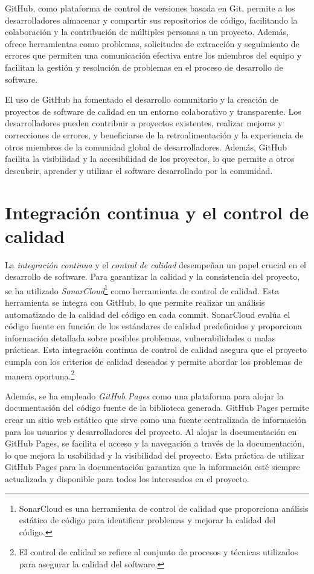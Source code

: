 GitHub, como plataforma de control de versiones basada en Git, permite a los desarrolladores 
almacenar y compartir sus repositorios de código, facilitando la colaboración y la contribución 
de múltiples personas a un proyecto. Además, ofrece herramientas como problemas, solicitudes de 
extracción y seguimiento de errores que permiten una comunicación efectiva entre los miembros del 
equipo y facilitan la gestión y resolución de problemas en el proceso de desarrollo de 
software.

El uso de GitHub ha fomentado el desarrollo comunitario y la creación de proyectos de software 
de calidad en un entorno colaborativo y transparente. Los desarrolladores pueden contribuir 
a proyectos existentes, realizar mejoras y correcciones de errores, y beneficiarse de la 
retroalimentación y la experiencia de otros miembros de la comunidad global de desarrolladores. 
Además, GitHub facilita la visibilidad y la accesibilidad de los proyectos, lo que permite a otros 
descubrir, aprender y utilizar el software desarrollado por la comunidad.

\section{Integración continua y el control de calidad}

La \textit{integración continua} y el \textit{control de calidad} desempeñan un papel crucial en el desarrollo de software. 
Para garantizar la calidad y la consistencia del proyecto, se ha utilizado \textit{SonarCloud}\footnote{SonarCloud es una herramienta de control de calidad que proporciona 
análisis estático de código para identificar problemas y mejorar la calidad del código.} como herramienta 
de control de calidad. Esta herramienta se integra con GitHub, lo que permite realizar un análisis 
automatizado de la calidad del código en cada commit. SonarCloud evalúa el código fuente en función 
de los estándares de calidad predefinidos y proporciona información detallada sobre posibles 
problemas, vulnerabilidades o malas prácticas. Esta integración continua de control de calidad 
asegura que el proyecto cumpla con los criterios de calidad deseados y permite abordar los 
problemas de manera oportuna.\footnote{El control de calidad se refiere al conjunto de procesos y técnicas utilizados para asegurar 
la calidad del software.}

Además, se ha empleado \textit{GitHub Pages} como una plataforma para alojar la documentación del código 
fuente de la biblioteca generada. GitHub Pages permite crear un sitio web estático que sirve 
como una fuente centralizada de información para los usuarios y desarrolladores del proyecto. 
Al alojar la documentación en GitHub Pages, se facilita el acceso y la navegación a través de 
la documentación, lo que mejora la usabilidad y la visibilidad del proyecto. Esta práctica de 
utilizar GitHub Pages para la documentación garantiza que la información esté siempre actualizada 
y disponible para todos los interesados en el proyecto.

